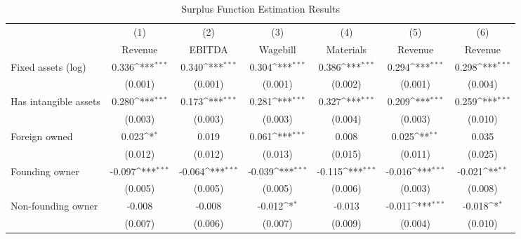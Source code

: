 \begin{table}[htbp]\centering
\def\sym#1{\ifmmode^{#1}\else\(^{#1}\)\fi}
\caption{Surplus Function Estimation Results}
\begin{tabular}{l*{6}{c}}
\toprule
                    &\multicolumn{1}{c}{(1)}&\multicolumn{1}{c}{(2)}&\multicolumn{1}{c}{(3)}&\multicolumn{1}{c}{(4)}&\multicolumn{1}{c}{(5)}&\multicolumn{1}{c}{(6)}\\
                    &\multicolumn{1}{c}{Revenue}&\multicolumn{1}{c}{EBITDA}&\multicolumn{1}{c}{Wagebill}&\multicolumn{1}{c}{Materials}&\multicolumn{1}{c}{Revenue}&\multicolumn{1}{c}{Revenue}\\
\midrule
Fixed assets (log)  &       0.336\sym{***}&       0.340\sym{***}&       0.304\sym{***}&       0.386\sym{***}&       0.294\sym{***}&       0.298\sym{***}\\
                    &     (0.001)         &     (0.001)         &     (0.001)         &     (0.002)         &     (0.001)         &     (0.004)         \\
\addlinespace
Has intangible assets&       0.280\sym{***}&       0.173\sym{***}&       0.281\sym{***}&       0.327\sym{***}&       0.209\sym{***}&       0.259\sym{***}\\
                    &     (0.003)         &     (0.003)         &     (0.003)         &     (0.004)         &     (0.003)         &     (0.010)         \\
\addlinespace
Foreign owned       &       0.023\sym{*}  &       0.019         &       0.061\sym{***}&       0.008         &       0.025\sym{**} &       0.035         \\
                    &     (0.012)         &     (0.012)         &     (0.013)         &     (0.015)         &     (0.011)         &     (0.025)         \\
\addlinespace
Founding owner      &      -0.097\sym{***}&      -0.064\sym{***}&      -0.039\sym{***}&      -0.115\sym{***}&      -0.016\sym{***}&      -0.021\sym{**} \\
                    &     (0.005)         &     (0.005)         &     (0.005)         &     (0.006)         &     (0.003)         &     (0.008)         \\
\addlinespace
Non-founding owner  &      -0.008         &      -0.008         &      -0.012\sym{*}  &      -0.013         &      -0.011\sym{***}&      -0.018\sym{*}  \\
                    &     (0.007)         &     (0.006)         &     (0.007)         &     (0.009)         &     (0.004)         &     (0.010)         \\

\end{tabular}
\end{table}
